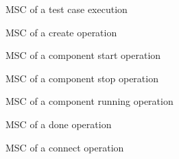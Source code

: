 \documentclass[a4paper,10pt]{article}
\begin{document}
\begin{figure}[!p]
\begin{center}
{}
\end{center}
\caption{\label{figure:executing_testcase}MSC of a test case execution}
\end{figure}

\begin{figure}[!p]
\begin{center}
{}
\end{center}
\caption{\label{figure:create_op}MSC of a create operation}
\end{figure}

\begin{figure}[!p]
\begin{center}
{}
\end{center}
\caption{\label{figure:start_op}MSC of a component start operation}
\end{figure}

\begin{figure}[!p]
\begin{center}
{}
\end{center}
\caption{\label{figure:stop_op}MSC of a component stop operation}
\end{figure}

\begin{figure}[!p]
\begin{center}
{}
\end{center}
\caption{\label{figure:running_op}MSC of a component running operation}
\end{figure}

\begin{figure}[!p]
\begin{center}
{}
\end{center}
\caption{\label{figure:done_op}MSC of a done operation}
\end{figure}

\begin{figure}[!p]
\begin{center}
{}
\end{center}
\caption{\label{figure:connect_op}MSC of a connect operation}
\end{figure}
\end{document}
